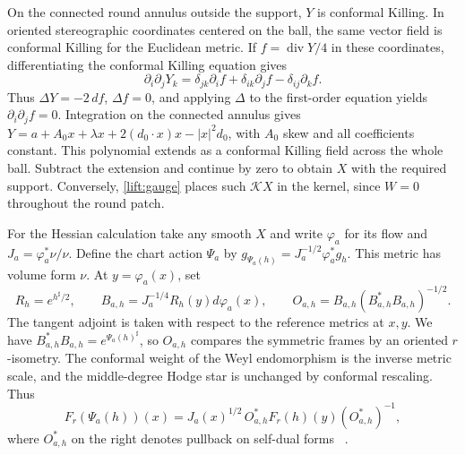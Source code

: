 \documentclass[11pt]{article}
\numberwithin{equation}{section}
\theoremstyle{definition}
\theoremstyle{remark}
\begin{document}
On the connected round annulus outside the support, \(Y\) is
conformal Killing. In oriented stereographic coordinates centered
on the ball, the same vector field is conformal Killing for the
Euclidean metric. If \(f=\operatorname{div}Y/4\) in these coordinates,
differentiating the conformal Killing equation gives
\[
 \partial_i\partial_jY_k
 =\delta_{jk}\partial_i f+\delta_{ik}\partial_j f-\delta_{ij}\partial_k f.
\]
Thus \(\Delta Y=-2\,df\), \(\Delta f=0\), and applying \(\Delta\)
to the first-order equation yields \(\partial_i\partial_j f=0\).
Integration on the connected annulus gives
\(Y=a+A_0x+\lambda x+2(d_0\cdot x)x-|x|^2d_0\), with \(A_0\)
skew and all coefficients constant. This polynomial extends as a
conformal Killing field across the whole ball. Subtract the extension
and continue by zero to obtain \(X\) with the required support.
Conversely, \eqref{lift:gauge} places such \(\mathcal K X\) in
the kernel, since \(W=0\) throughout the round patch.

For the Hessian calculation take any smooth \(X\) and write
\(\varphi_a\) for its flow and \(J_a=\varphi_a^*\nu/\nu\).
Define the chart action \(\Psi_a\) by
\(g_{\Psi_a(h)}=J_a^{-1/2}\varphi_a^*g_h\).
This metric has volume form \(\nu\). At \(y=\varphi_a(x)\), set
\[
 R_h=e^{h^\sharp/2},\qquad B_{a,h}=J_a^{-1/4}R_h(y)d\varphi_a(x),
 \qquad O_{a,h}=B_{a,h}(B_{a,h}^*B_{a,h})^{-1/2}.
\]
The tangent adjoint is taken with respect to the reference
metrics at \(x,y\). We have \(B_{a,h}^*B_{a,h}=e^{\Psi_a(h)^\sharp}\),
so \(O_{a,h}\) compares the symmetric frames by an oriented
\(r\)-isometry. The conformal weight of the Weyl endomorphism
is the inverse metric scale, and the middle-degree Hodge star
is unchanged by conformal rescaling. Thus
\begin{equation}\label{mscone:naturality}
 F_r(\Psi_a(h))(x)=J_a(x)^{1/2}\,
 O_{a,h}^* F_r(h)(y)(O_{a,h}^*)^{-1},
\end{equation}
where \(O_{a,h}^*\) on the right denotes pullback on self-dual forms
~\cite[discussion after (6.7)]{FeffermanGraham2008Ambient}.
\end{document}
